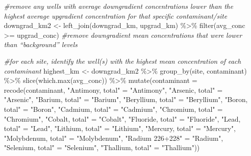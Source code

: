 \documentclass[12pt, twoside]{amherstthesis}
\newenvironment{Shaded}{\begin{snugshade}}{\end{snugshade}}
\newcommand{\AttributeTok}[1]{\textcolor[rgb]{0.77,0.63,0.00}{#1}}
\newcommand{\CommentTok}[1]{\textcolor[rgb]{0.56,0.35,0.01}{\textit{#1}}}
\newcommand{\FunctionTok}[1]{\textcolor[rgb]{0.00,0.00,0.00}{#1}}
\newcommand{\NormalTok}[1]{#1}
\newcommand{\OtherTok}[1]{\textcolor[rgb]{0.56,0.35,0.01}{#1}}
\newcommand{\SpecialCharTok}[1]{\textcolor[rgb]{0.00,0.00,0.00}{#1}}
\newcommand{\StringTok}[1]{\textcolor[rgb]{0.31,0.60,0.02}{#1}}
\begin{document}
\begin{Shaded}
\begin{Highlighting}[]
\CommentTok{\#remove any wells with average downgradient concentrations lower than the highest average upgradient concentration for that specific contaminant/site}
\NormalTok{downgrad\_km2 }\OtherTok{\textless{}{-}} \FunctionTok{left\_join}\NormalTok{(downgrad\_km, upgrad\_km) }\SpecialCharTok{\%\textgreater{}\%}
  \FunctionTok{filter}\NormalTok{(avg\_conc }\SpecialCharTok{\textgreater{}=}\NormalTok{ upgrad\_conc) }\CommentTok{\#remove downgradient mean concentrations that were lower than “background” levels}


\CommentTok{\#for each site, identify the well(s) with the highest mean concentration of each contaminant}
\NormalTok{highest\_km }\OtherTok{\textless{}{-}}\NormalTok{ downgrad\_km2 }\SpecialCharTok{\%\textgreater{}\%}
  \FunctionTok{group\_by}\NormalTok{(site, contaminant) }\SpecialCharTok{\%\textgreater{}\%}
  \FunctionTok{slice}\NormalTok{(}\FunctionTok{which.max}\NormalTok{(avg\_conc)) }\SpecialCharTok{\%\textgreater{}\%}
  \FunctionTok{mutate}\NormalTok{(}\AttributeTok{contaminant =} \FunctionTok{recode}\NormalTok{(contaminant,}
                              \StringTok{"Antimony, total"} \OtherTok{=} \StringTok{"Antimony"}\NormalTok{,}
                              \StringTok{"Arsenic, total"} \OtherTok{=} \StringTok{"Arsenic"}\NormalTok{,}
                              \StringTok{"Barium, total"} \OtherTok{=} \StringTok{"Barium"}\NormalTok{,}
                              \StringTok{"Beryllium, total"} \OtherTok{=} \StringTok{"Beryllium"}\NormalTok{,}
                              \StringTok{"Boron, total"} \OtherTok{=} \StringTok{"Boron"}\NormalTok{,}
                              \StringTok{"Cadmium, total"} \OtherTok{=} \StringTok{"Cadmium"}\NormalTok{,}
                              \StringTok{"Chromium, total"} \OtherTok{=} \StringTok{"Chromium"}\NormalTok{,}
                              \StringTok{"Cobalt, total"} \OtherTok{=} \StringTok{"Cobalt"}\NormalTok{,}
                              \StringTok{"Fluoride, total"} \OtherTok{=} \StringTok{"Fluoride"}\NormalTok{,}
                              \StringTok{"Lead, total"} \OtherTok{=} \StringTok{"Lead"}\NormalTok{,}
                              \StringTok{"Lithium, total"} \OtherTok{=} \StringTok{"Lithium"}\NormalTok{,}
                              \StringTok{"Mercury, total"} \OtherTok{=} \StringTok{"Mercury"}\NormalTok{,}
                              \StringTok{"Molybdenum, total"} \OtherTok{=} \StringTok{"Molybdenum"}\NormalTok{,}
                              \StringTok{"Radium 226+228"} \OtherTok{=} \StringTok{"Radium"}\NormalTok{,}
                              \StringTok{"Selenium, total"} \OtherTok{=} \StringTok{"Selenium"}\NormalTok{,}
                              \StringTok{"Thallium, total"} \OtherTok{=} \StringTok{"Thallium"}\NormalTok{))}


\end{Highlighting}
\end{Shaded}
\end{document}
